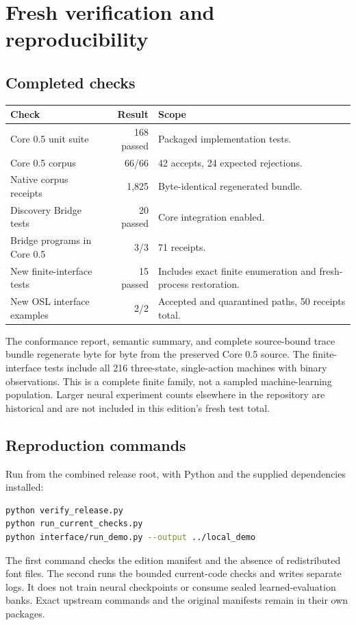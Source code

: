\documentclass[11pt]{article}
\begin{document}
\section{Fresh verification and reproducibility}
\subsection{Completed checks}
\begin{center}\begin{tabularx}{\textwidth}{l r X}
\toprule Check & Result & Scope\\\midrule
Core 0.5 unit suite & 168 passed & Packaged implementation tests.\\
Core 0.5 corpus & 66/66 & 42 accepts, 24 expected rejections.\\
Native corpus receipts & 1,825 & Byte-identical regenerated bundle.\\
Discovery Bridge tests & 20 passed & Core integration enabled.\\
Bridge programs in Core 0.5 & 3/3 & 71 receipts.\\
New finite-interface tests & 15 passed & Includes exact finite enumeration and fresh-process restoration.\\
New OSL interface examples & 2/2 & Accepted and quarantined paths, 50 receipts total.\\\bottomrule
\end{tabularx}\end{center}
The conformance report, semantic summary, and complete source-bound trace bundle regenerate byte for byte from the preserved Core 0.5 source. The finite-interface tests include all 216 three-state, single-action machines with binary observations. This is a complete finite family, not a sampled machine-learning population. Larger neural experiment counts elsewhere in the repository are historical and are not included in this edition's fresh test total.

\subsection{Reproduction commands}
Run from the combined release root, with Python and the supplied dependencies installed:
\begin{lstlisting}[language=bash]
python verify_release.py
python run_current_checks.py
python interface/run_demo.py --output ../local_demo
\end{lstlisting}
The first command checks the edition manifest and the absence of redistributed font files. The second runs the bounded current-code checks and writes separate logs. It does not train neural checkpoints or consume sealed learned-evaluation banks. Exact upstream commands and the original manifests remain in their own packages.
\end{document}
